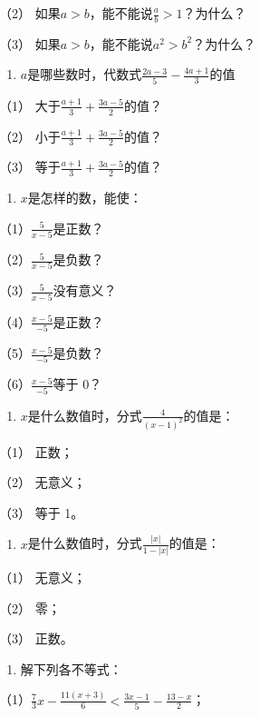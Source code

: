 （2） 如果\(a > b\)，能不能说\(\frac{a}{b} > 1\)？为什么？

（3） 如果\(a > b\)，能不能说\(a^2 > b^2\)？为什么？

\begin{enumerate}[start=9]
\item
  \(a\)是哪些数时，代数式\(\frac{2a - 3}{5} -\frac{4a + 1}{3}\)的值
\end{enumerate}

（1） 大于\(\frac{a + 1}{3} + \frac{3a - 5}{2}\)的值？

（2） 小于\(\frac{a + 1}{3} + \frac{3a - 5}{2}\)的值？

（3） 等于\(\frac{a + 1}{3} + \frac{3a - 5}{2}\)的值？

\begin{enumerate}[start=10]
\item
  \(x\)是怎样的数，能使：
\end{enumerate}

（1）\(\frac{5}{x - 5}\)是正数？

（2）\(\frac{5}{x - 5}\)是负数？

（3）\(\frac{5}{x - 5}\)没有意义？

（4）\(\frac{x - 5}{-5}\)是正数？

（5）\(\frac{x - 5}{-5}\)是负数？

（6）\(\frac{x - 5}{-5}\)等于 0？

\begin{enumerate}[start=11]
\item
  \(x\)是什么数值时，分式\(\frac{4}{(x - 1)^2}\)的值是：
\end{enumerate}

（1） 正数；

（2） 无意义；

（3） 等于 1。

\begin{enumerate}[start=12]
\item
  \(x\)是什么数值时，分式\(\frac{|x|}{1 - |x|}\)的值是：
\end{enumerate}

（1） 无意义；

（2） 零；

（3） 正数。

\begin{enumerate}[start=13]
\item
  解下列各不等式：
\end{enumerate}

（1）\(\frac{7}{3} x - \frac{11(x + 3)}{6} < \frac{3x - 1}{5} - \frac{13 - x}{2}\)；

